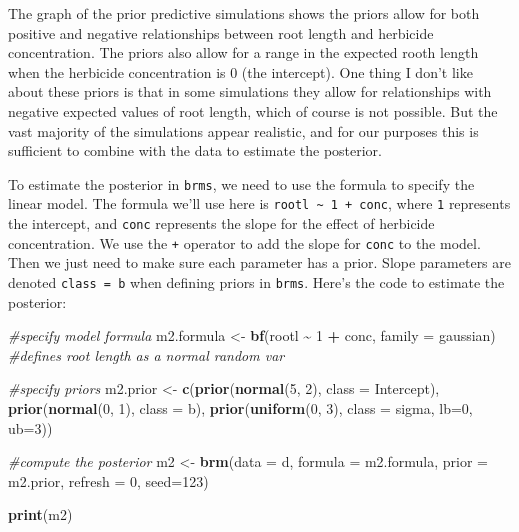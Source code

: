 \documentclass[
]{book}
\newenvironment{Shaded}{\begin{snugshade}}{\end{snugshade}}
\newcommand{\AttributeTok}[1]{\textcolor[rgb]{0.13,0.29,0.53}{#1}}
\newcommand{\CommentTok}[1]{\textcolor[rgb]{0.56,0.35,0.01}{\textit{#1}}}
\newcommand{\DecValTok}[1]{\textcolor[rgb]{0.00,0.00,0.81}{#1}}
\newcommand{\FunctionTok}[1]{\textcolor[rgb]{0.13,0.29,0.53}{\textbf{#1}}}
\newcommand{\NormalTok}[1]{#1}
\newcommand{\OtherTok}[1]{\textcolor[rgb]{0.56,0.35,0.01}{#1}}
\newcommand{\SpecialCharTok}[1]{\textcolor[rgb]{0.81,0.36,0.00}{\textbf{#1}}}
\begin{document}
The graph of the prior predictive simulations shows the priors allow for both positive and negative relationships between root length and herbicide concentration. The priors also allow for a range in the expected rooth length when the herbicide concentration is 0 (the intercept). One thing I don't like about these priors is that in some simulations they allow for relationships with negative expected values of root length, which of course is not possible. But the vast majority of the simulations appear realistic, and for our purposes this is sufficient to combine with the data to estimate the posterior.

To estimate the posterior in \texttt{brms}, we need to use the formula to specify the linear model. The formula we'll use here is \texttt{rootl\ \textasciitilde{}\ 1\ +\ conc}, where \texttt{1} represents the intercept, and \texttt{conc} represents the slope for the effect of herbicide concentration. We use the \texttt{+} operator to add the slope for \texttt{conc} to the model. Then we just need to make sure each parameter has a prior. Slope parameters are denoted \texttt{class\ =\ b} when defining priors in \texttt{brms}. Here's the code to estimate the posterior:

\begin{Shaded}
\begin{Highlighting}[]
\CommentTok{\#specify model formula}
\NormalTok{m2.formula }\OtherTok{\textless{}{-}} \FunctionTok{bf}\NormalTok{(rootl }\SpecialCharTok{\textasciitilde{}} \DecValTok{1} \SpecialCharTok{+}\NormalTok{ conc,}
                \AttributeTok{family =}\NormalTok{ gaussian) }\CommentTok{\#defines root length as a normal random var}

\CommentTok{\#specify priors}
\NormalTok{m2.prior }\OtherTok{\textless{}{-}} \FunctionTok{c}\NormalTok{(}\FunctionTok{prior}\NormalTok{(}\FunctionTok{normal}\NormalTok{(}\DecValTok{5}\NormalTok{, }\DecValTok{2}\NormalTok{), }\AttributeTok{class =}\NormalTok{ Intercept),}
              \FunctionTok{prior}\NormalTok{(}\FunctionTok{normal}\NormalTok{(}\DecValTok{0}\NormalTok{, }\DecValTok{1}\NormalTok{), }\AttributeTok{class =}\NormalTok{ b),}
              \FunctionTok{prior}\NormalTok{(}\FunctionTok{uniform}\NormalTok{(}\DecValTok{0}\NormalTok{, }\DecValTok{3}\NormalTok{), }\AttributeTok{class =}\NormalTok{ sigma, }\AttributeTok{lb=}\DecValTok{0}\NormalTok{, }\AttributeTok{ub=}\DecValTok{3}\NormalTok{))}
              
\CommentTok{\#compute the posterior}
\NormalTok{m2 }\OtherTok{\textless{}{-}} \FunctionTok{brm}\NormalTok{(}\AttributeTok{data =}\NormalTok{ d,}
         \AttributeTok{formula =}\NormalTok{ m2.formula,}
         \AttributeTok{prior =}\NormalTok{ m2.prior,}
         \AttributeTok{refresh =} \DecValTok{0}\NormalTok{,}
         \AttributeTok{seed=}\DecValTok{123}\NormalTok{)}

\FunctionTok{print}\NormalTok{(m2)}
\end{Highlighting}
\end{Shaded}
\end{document}
